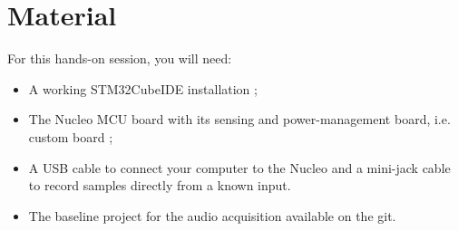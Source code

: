 \section*{Material}

For this hands-on session, you will need:
\begin{itemize}
    \item A working STM32CubeIDE installation ;
    \item The Nucleo MCU board with its sensing and power-management board, i.e. custom board ;
    \item A USB cable to connect your computer to the Nucleo and a mini-jack cable to record samples directly from a known input.
    \item The baseline project for the audio acquisition available on the git.
\end{itemize}
